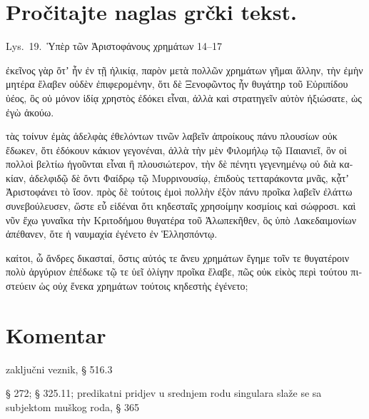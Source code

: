 
\section*{Pročitajte naglas grčki tekst.}

Lys.\ 19.\ Ὑπὲρ τῶν Ἀριστοφάνους χρημάτων 14–17


\medskip


{\large

\begin{greek}

\noindent  ἐκεῖνος γὰρ ὅτʼ ἦν ἐν τῇ ἡλικίᾳ, παρὸν μετὰ πολλῶν χρημάτων γῆμαι ἄλλην, τὴν ἐμὴν μητέρα ἔλαβεν οὐδὲν ἐπιφερομένην, ὅτι δὲ Ξενοφῶντος ἦν θυγάτηρ τοῦ Εὐριπίδου ὑέος, ὃς οὐ μόνον ἰδίᾳ χρηστὸς ἐδόκει εἶναι, ἀλλὰ καὶ στρατηγεῖν αὐτὸν ἠξιώσατε, ὡς ἐγὼ ἀκούω.

τὰς τοίνυν ἐμὰς ἀδελφὰς ἐθελόντων τινῶν λαβεῖν ἀπροίκους πάνυ πλουσίων οὐκ ἔδωκεν, ὅτι ἐδόκουν κάκιον γεγονέναι, ἀλλὰ τὴν μὲν Φιλομήλῳ τῷ Παιανιεῖ, ὃν οἱ πολλοὶ βελτίω ἡγοῦνται εἶναι ἢ πλουσιώτερον, τὴν δὲ πένητι γεγενημένῳ οὐ διὰ κακίαν, ἀδελφιδῷ δὲ ὄντι Φαίδρῳ τῷ Μυρρινουσίῳ, ἐπιδοὺς τετταράκοντα μνᾶς, κᾆτʼ Ἀριστοφάνει τὸ ἴσον. πρὸς δὲ τούτοις ἐμοὶ πολλὴν ἐξὸν πάνυ προῖκα λαβεῖν ἐλάττω συνεβούλευσεν, ὥστε εὖ εἰδέναι ὅτι κηδεσταῖς χρησοίμην κοσμίοις καὶ σώφροσι. καὶ νῦν ἔχω γυναῖκα τὴν Κριτοδήμου θυγατέρα τοῦ Ἀλωπεκῆθεν, ὃς ὑπὸ Λακεδαιμονίων ἀπέθανεν, ὅτε ἡ ναυμαχία ἐγένετο ἐν Ἑλλησπόντῳ.

καίτοι, ὦ ἄνδρες δικασταί, ὅστις αὐτός τε ἄνευ χρημάτων ἔγημε τοῖν τε θυγατέροιν πολὺ ἀργύριον ἐπέδωκε τῷ τε ὑεῖ ὀλίγην προῖκα ἔλαβε, πῶς οὐκ εἰκὸς περὶ τούτου πιστεύειν ὡς οὐχ ἕνεκα χρημάτων τούτοις κηδεστὴς ἐγένετο;


\end{greek}

}


\section*{Komentar}




\begin{description}[noitemsep]
\item[τοίνυν] zaključni veznik, § 516.3
\item[κάκιον γεγονέναι] § 272; § 325.11; predikatni pridjev u srednjem rodu singulara slaže se sa subjektom muškog roda, § 365
\end{description}

